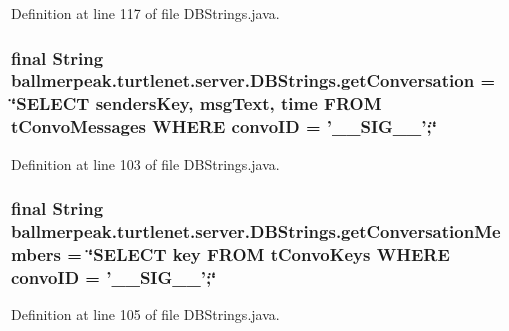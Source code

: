 Definition at line 117 of file D\-B\-Strings.\-java.

\hypertarget{classballmerpeak_1_1turtlenet_1_1server_1_1DBStrings_a764e619962ecc020606b3f8b2f3068dd}{
\subsubsection[{get\-Conversation}]{\setlength{\rightskip}{0pt plus 5cm}final String ballmerpeak.\-turtlenet.\-server.\-D\-B\-Strings.\-get\-Conversation = \char`\"{}S\-E\-L\-E\-C\-T senders\-Key, msg\-Text, time F\-R\-O\-M t\-Convo\-Messages W\-H\-E\-R\-E convo\-I\-D = '\-\_\-\-\_\-\-S\-I\-G\-\_\-\-\_\-';\char`\"{}\hspace{0.3cm}{\ttfamily [static]}}}\label{classballmerpeak_1_1turtlenet_1_1server_1_1DBStrings_a764e619962ecc020606b3f8b2f3068dd}


Definition at line 103 of file D\-B\-Strings.\-java.

\hypertarget{classballmerpeak_1_1turtlenet_1_1server_1_1DBStrings_adb5c2853326eef2b392ebcdf237c66b0}{
\subsubsection[{get\-Conversation\-Members}]{\setlength{\rightskip}{0pt plus 5cm}final String ballmerpeak.\-turtlenet.\-server.\-D\-B\-Strings.\-get\-Conversation\-Members = \char`\"{}S\-E\-L\-E\-C\-T key F\-R\-O\-M t\-Convo\-Keys W\-H\-E\-R\-E convo\-I\-D = '\-\_\-\-\_\-\-S\-I\-G\-\_\-\-\_\-';\char`\"{}\hspace{0.3cm}{\ttfamily [static]}}}\label{classballmerpeak_1_1turtlenet_1_1server_1_1DBStrings_adb5c2853326eef2b392ebcdf237c66b0}


Definition at line 105 of file D\-B\-Strings.\-java.

